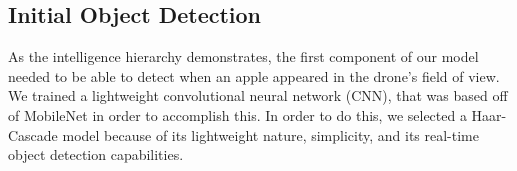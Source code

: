 \subsection{Initial Object Detection}
As the intelligence hierarchy demonstrates, the first component of our model needed to be able to detect when an apple appeared in the drone's field of view. 
We trained a lightweight convolutional neural network (CNN), that was based off of MobileNet in order to accomplish this. 
In order to do this, we selected a Haar-Cascade model because of its lightweight nature, simplicity, and its real-time object detection capabilities. 